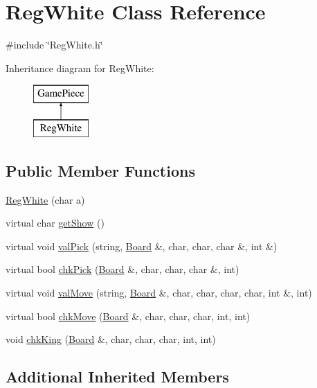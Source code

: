 \hypertarget{class_reg_white}{\section{Reg\-White Class Reference}
\label{class_reg_white}
}


{\ttfamily \#include \char`\"{}Reg\-White.\-h\char`\"{}}

Inheritance diagram for Reg\-White\-:\begin{figure}[H]
\begin{center}
\leavevmode
\includegraphics[height=2.000000cm]{class_reg_white}
\end{center}
\end{figure}
\subsection*{Public Member Functions}
\begin{DoxyCompactItemize}
\item 
\hyperlink{class_reg_white_a2a424aed051c97e73ffa03ac7a9b9ec0}{Reg\-White} (char a)
\item 
virtual char \hyperlink{class_reg_white_aa59f0cfb60c36f631004242c33dfcabc}{get\-Show} ()
\item 
virtual void \hyperlink{class_reg_white_a7995b3b0df425a15c9da2bf8be8dca3a}{val\-Pick} (string, \hyperlink{class_board}{Board} \&, char, char, char \&, int \&)
\item 
virtual bool \hyperlink{class_reg_white_a298051d178de6cd50689ad43e8bc9f04}{chk\-Pick} (\hyperlink{class_board}{Board} \&, char, char, char \&, int)
\item 
virtual void \hyperlink{class_reg_white_a9bdb0787be549a35da2afe05950ba2f1}{val\-Move} (string, \hyperlink{class_board}{Board} \&, char, char, char, char, int \&, int)
\item 
virtual bool \hyperlink{class_reg_white_acacc51249fc17deb0e1f50cc9c09d068}{chk\-Move} (\hyperlink{class_board}{Board} \&, char, char, char, int, int)
\item 
void \hyperlink{class_reg_white_a6062b358e5da3b86ccfc3136664daaaf}{chk\-King} (\hyperlink{class_board}{Board} \&, char, char, char, int, int)
\end{DoxyCompactItemize}
\subsection*{Additional Inherited Members}


